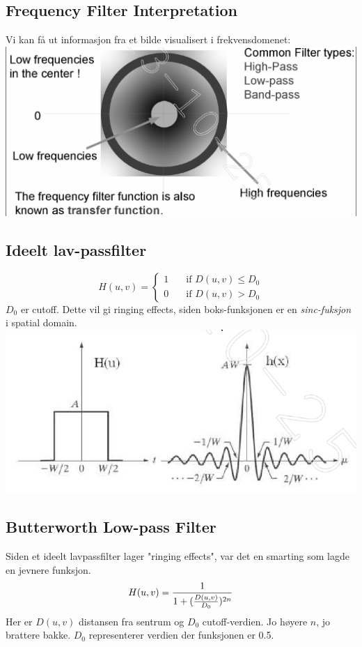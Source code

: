 \subsection{Frequency Filter Interpretation}
Vi kan få ut informasjon fra et bilde visualisert i frekvensdomenet:
\\ \includegraphics[width=\textwidth]{Bilder/ffi.png}

\subsection{Ideelt lav-passfilter}
\begin{equation}
    H(u,v) = \left\{
        \begin{array} {ll}
            1 & \quad \text{if $D(u,v) \le D_0$} \\
            0 & \quad \text{if $D(u,v) > D_0$}
        \end{array}
        \right.
\end{equation}
$D_0$ er cutoff. Dette vil gi ringing effects, siden boks-funksjonen er en \emph{sinc-fuksjon} i spatial domain.
\\ \includegraphics[width=\textwidth]{Bilder/ringing.png}

\subsection{Butterworth Low-pass Filter}
Siden et ideelt lavpassfilter lager "ringing effects", var det en smarting som lagde en jevnere funksjon.
\begin{equation}
    H(u,v) = {1 \over
        1 + ({D(u,v) \over D_0})^{2n}
    }
\end{equation}
Her er $D(u,v)$ distansen fra sentrum og $D_0$ cutoff-verdien. Jo høyere $n$, jo brattere bakke. $D_0$ representerer verdien der funksjonen er 0.5.

